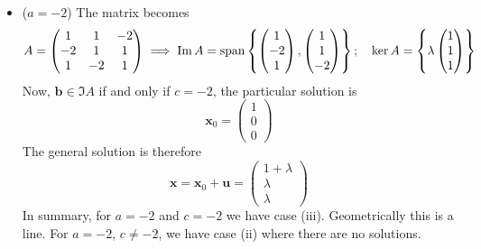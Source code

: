 \documentclass{article}
\begin{document}
\begin{itemize}
		\item ($a=-2$) The matrix becomes
		\[ A = \begin{pmatrix}
			1 & 1 & -2 \\ -2 & 1 & 1 \\ 1 & -2 & 1
		\end{pmatrix} \implies \Im A = \operatorname{span} \left\{ \begin{pmatrix}
			1 \\ -2 \\ 1
		\end{pmatrix}, \begin{pmatrix}
			1 \\ 1 \\ -2
		\end{pmatrix} \right\};\quad \ker A = \left\{ \lambda\begin{pmatrix}
			1 \\ 1 \\ 1
		\end{pmatrix} \right\} \]
		Now, $\bm b \in \Im A$ if and only if $c = -2$, the particular solution is
		\[ \bm x_0 = \begin{pmatrix}
			1 \\ 0 \\ 0
		\end{pmatrix} \]
		The general solution is therefore
		\[ \bm x = \bm x_0 + \bm u = \begin{pmatrix}
			1 + \lambda \\ \lambda \\ \lambda
		\end{pmatrix} \]
		In summary, for $a=-2$ and $c=-2$ we have case (iii). Geometrically this is a line. For $a=-2$, $c \neq -2$, we have case (ii) where there are no solutions.
	\end{itemize}
\end{document}
